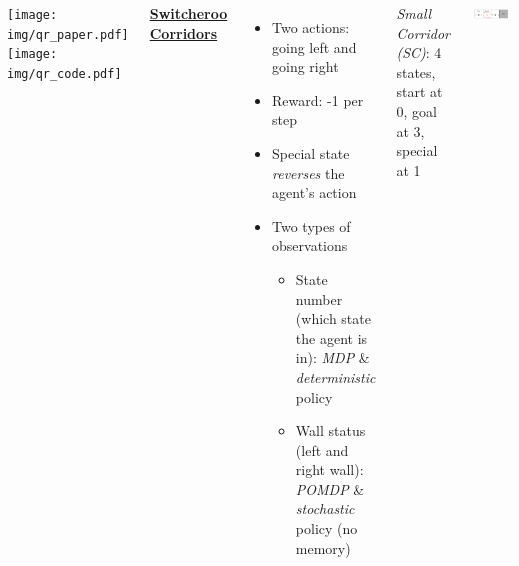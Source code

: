 \documentclass{tikzposter} %
\begin{document}
\begin{columns}
{        \vspace{0.1em}

        \begin{center}
            \texttt{[image: img/qr\_paper.pdf]}
            \hspace{30pt}
            \texttt{[image: img/qr\_code.pdf]}

            \vspace{10pt}

            {
                \AtNextBibliography{\tiny}
                \printbibliography[heading=none]
            }
        \end{center}

    }



     {

        {\color{ImperialBlue}\underline{\sffamily\textbf{Switcheroo Corridors}}}

        \begin{itemize}
            \item Two actions: going left and going right

            \item Reward: -1 per step

            \item Special state \emph{reverses} the agent's action

            \item Two types of observations
                  \begin{itemize}
                      \item State number (which state the agent is in):
                            \emph{MDP} \& \emph{deterministic} policy
                      \item Wall status (left and right wall): \emph{POMDP} \&
                            \emph{stochastic} policy (no memory)
                  \end{itemize}
        \end{itemize}

        \emph{Small Corridor (SC)}: 4 states, start at 0, goal at 3, special at
        1
        \begin{center}
            \includegraphics[width=0.8\colwidth]{img/small-corridor}
        \end{center}

}
\end{columns}
\end{document}
